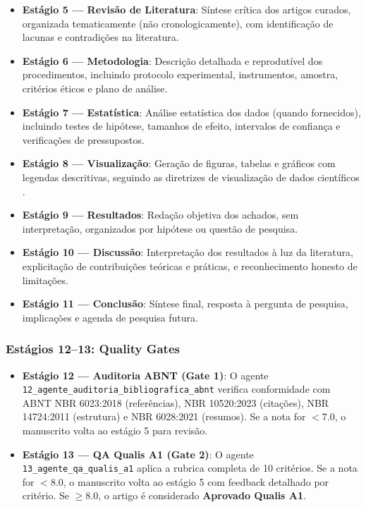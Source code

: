 \begin{itemize}
  \item \textbf{Estágio 5 — Revisão de Literatura}: Síntese crítica dos artigos curados, organizada tematicamente (não cronologicamente), com identificação de lacunas e contradições na literatura.
  \item \textbf{Estágio 6 — Metodologia}: Descrição detalhada e reprodutível dos procedimentos, incluindo protocolo experimental, instrumentos, amostra, critérios éticos e plano de análise.
  \item \textbf{Estágio 7 — Estatística}: Análise estatística dos dados (quando fornecidos), incluindo testes de hipótese, tamanhos de efeito, intervalos de confiança e verificações de pressupostos.
  \item \textbf{Estágio 8 — Visualização}: Geração de figuras, tabelas e gráficos com legendas descritivas, seguindo as diretrizes de visualização de dados científicos \citep{tufte2001visual}.
  \item \textbf{Estágio 9 — Resultados}: Redação objetiva dos achados, sem interpretação, organizados por hipótese ou questão de pesquisa.
  \item \textbf{Estágio 10 — Discussão}: Interpretação dos resultados à luz da literatura, explicitação de contribuições teóricas e práticas, e reconhecimento honesto de limitações.
  \item \textbf{Estágio 11 — Conclusão}: Síntese final, resposta à pergunta de pesquisa, implicações e agenda de pesquisa futura.
\end{itemize}

\subsubsection{Estágios 12--13: Quality Gates}

\begin{itemize}
  \item \textbf{Estágio 12 — Auditoria ABNT (Gate 1)}: O agente \texttt{12\_agente\_auditoria\_bibliografica\_abnt} verifica conformidade com ABNT NBR 6023:2018 (referências), NBR 10520:2023 (citações), NBR 14724:2011 (estrutura) e NBR 6028:2021 (resumos). Se a nota for $< 7.0$, o manuscrito volta ao estágio 5 para revisão.
  
  \item \textbf{Estágio 13 — QA Qualis A1 (Gate 2)}: O agente \texttt{13\_agente\_qa\_qualis\_a1} aplica a rubrica completa de 10 critérios. Se a nota for $< 8.0$, o manuscrito volta ao estágio 5 com feedback detalhado por critério. Se $\ge 8.0$, o artigo é considerado \textbf{Aprovado Qualis A1}.
\end{itemize}

